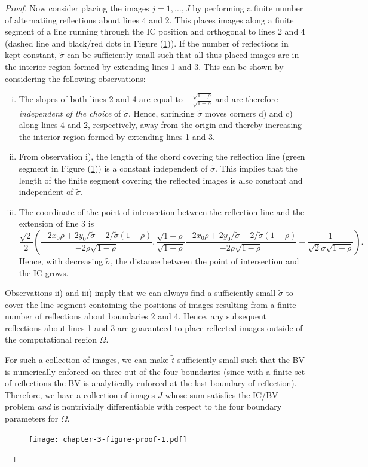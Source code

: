 \documentclass[10pt]{article}
\begin{document}
\begin{proof}
  Now consider placing the images $j = 1, \ldots, J$ by performing a
  finite number of alternatiing reflections about lines 4 and 2. This
  places images along a finite segment of a line running through the
  IC position and orthogonal to lines 2 and 4 (dashed line and
  black/red dots in Figure (\ref{fig:proof-1})). If the number of
  reflections in kept constant, $\tilde{\sigma}$ can be sufficiently
  small such that all thus placed images are in the interior region
  formed by extending lines 1 and 3. This can be shown by considering
  the following observations:
  \begin{enumerate}[i)]
  \item The slopes of both lines 2 and 4 are equal to
    $-\frac{\sqrt{1+\rho}}{\sqrt{1-\rho}}$ and are therefore
    \textit{independent of the choice} of $\tilde{\sigma}$. Hence,
    shrinking $\tilde{\sigma}$ moves corners d) and c) along lines 4
    and 2, respectively, away from the origin and thereby increasing
    the interior region formed by extending lines 1 and 3.
  \item From observation i), the length of the chord covering the
    reflection line (green segment in Figure
    (\ref{fig:proof-1})) is a constant independent of
    $\tilde{\sigma}$.  This implies that the length of the finite
    segment covering the reflected images is also constant and
    independent of $\tilde{\sigma}$.
  \item The coordinate of the point of intersection between the
    reflection line and the extension of line 3 is
    \[
      \frac{\sqrt{2}}{2} \left( \frac{-2 x_0\rho + 2
          y_0/\tilde{\sigma} -
          2/\tilde{\sigma}(1-\rho)}{-2\rho\sqrt{1-\rho}},
        \frac{\sqrt{1-\rho}}{\sqrt{1+\rho}}\frac{-2 x_0\rho + 2
          y_0/\tilde{\sigma} -
          2/\tilde{\sigma}(1-\rho)}{-2\rho\sqrt{1-\rho}} +
        \frac{1}{\sqrt{2}\tilde{\sigma}\sqrt{1+\rho}} \right).
    \]
    Hence, with decreasing $\tilde{\sigma}$, the distance between the
    point of intersection and the IC grows.
  \end{enumerate}
  Observations ii) and iii) imply that we can always find a
  sufficiently small $\tilde{\sigma}$ to cover the line segment
  containing the positions of images resulting from a finite number of
  reflections about boundaries 2 and 4.  Hence, any subsequent
  reflections about lines 1 and 3 are guaranteed to place reflected
  images outside of the computational region $\Omega$.

  For such a collection of images, we can make $\tilde{t}$
  sufficiently small such that the BV is numerically enforced on three
  out of the four boundaries (since with a finite set of reflections
  the BV is analytically enforced at the last boundary of
  reflection). Therefore, we have a collection of images $J$ whose sum
  satisfies the IC/BV problem \textit{and} is nontrivially
  differentiable with respect to the four boundary parameters for
  $\Omega$.

  \begin{figure}
    \centering
    \texttt{[image: chapter-3-figure-proof-1.pdf]}
    \caption{}
    \label{fig:proof-1}
  \end{figure}
\end{proof}

\section{}
\end{document}
